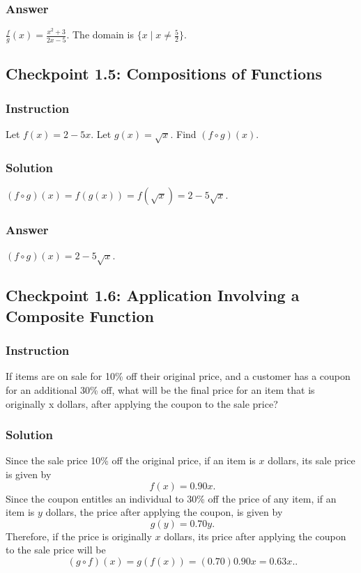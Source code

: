 \documentclass[11pt, letterpaper, oneside]{memoir}
\begin{document}
\subsubsection{Answer}

$ \frac{f}{g}(x) = \frac{x^2 + 3}{2x - 5} $. The domain is $ \{ x \mid x \ne \frac{5}{2} \} $.

\subsection*{Checkpoint 1.5: Compositions of Functions}

\subsubsection{Instruction}

Let $ f(x) = 2 - 5x $. Let $ g(x) = \sqrt{x} $. Find $ (f \circ g)(x) $.

\subsubsection{Solution}

$ (f \circ g)(x) = f(g(x)) = f(\sqrt{x}) = 2 - 5\sqrt{x} $.

\subsubsection{Answer}

$ (f \circ g)(x) = 2 - 5\sqrt{x} $.

\subsection*{Checkpoint 1.6: Application Involving a Composite Function}

\subsubsection{Instruction}

If items are on sale for 10\% off their original price, and a customer has a coupon for an additional 30\% off, what will be the final price for an item that is originally x dollars, after applying the coupon to the sale price?

\subsubsection{Solution}

Since the sale price 10\% off the original price, if an item is $ x $ dollars, its sale price is given by
$$ \phantom{.}
f(x) = 0.90x
.$$
Since the coupon entitles an individual to 30\% off the price of any item, if an item is $ y $ dollars, the price after applying the coupon, is given by
$$ \phantom{.}
g(y) = 0.70y
.$$
Therefore, if the price is originally $ x $ dollars, its price after applying the coupon to the sale price will be
$$ \phantom{.}
(g \circ f)(x) = g(f(x)) = (0.70)0.90x = 0.63x.
.$$
\end{document}
